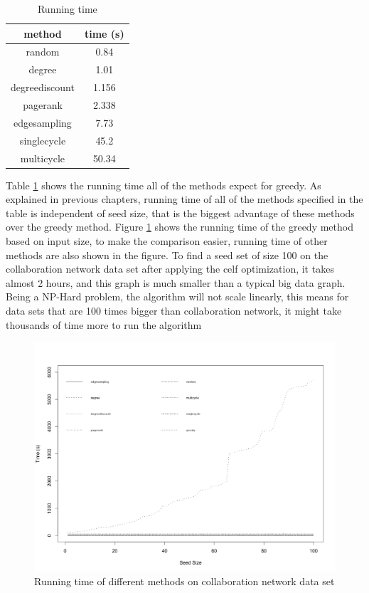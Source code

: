 \documentclass[english]{tktltiki}
\begin{document}
\begin{table}[ht!]
\centering
\begin{tabular}{ |c|c| }
\hline 
  method & time (s)\\
  \hline 
  random & 0.84\\
  degree & 1.01\\
  degreediscount&1.156\\
  pagerank&2.338\\
  edgesampling&7.73\\
  singlecycle&45.2\\
  multicycle&50.34\\
  \hline 
\end{tabular}
\caption{Running time}
\label{hep:timetable}
\end{table}
Table \ref{hep:timetable} shows the running time all of the methods expect for greedy. As explained in previous chapters, running time of all of the methods specified in the table is independent of seed size, that is the biggest advantage of these methods over the greedy method. Figure \ref{hep:times} shows the running time of the greedy method based on input size, to make the comparison easier, running time of other methods are also shown in the figure. To find a seed set of size 100 on the collaboration network data set after applying the celf optimization, it takes almost 2 hours, and this graph is much smaller than a typical big data graph. Being a NP-Hard problem, the algorithm will not scale linearly, this means for data sets that are 100 times bigger than collaboration network, it might take thousands of time more to run the algorithm
\begin{figure}[H]
\centering
\includegraphics[width=130mm]{figures/hep/times.png}
\caption{Running time of different methods on collaboration network data set}
\label{hep:times}
\end{figure}
\end{document}
